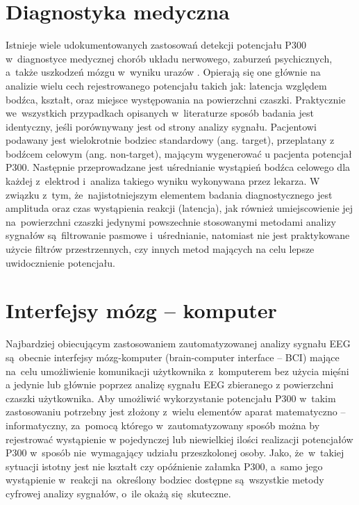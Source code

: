 \documentclass[licencjacka,openright]{pracamgr}
\begin{document}
\section{Diagnostyka medyczna}
Istnieje wiele udokumentowanych zastosowań detekcji potencjału P300 w~diagnostyce medycznej chorób układu nerwowego, zaburzeń psychicznych, a~także uszkodzeń mózgu w~wyniku urazów \citep{zgorzalewicz2000}. Opierają się one głównie na analizie wielu cech rejestrowanego potencjału takich jak: latencja względem bodźca, kształt, oraz miejsce występowania na powierzchni czaszki. Praktycznie we~wszystkich przypadkach opisanych w~literaturze sposób badania jest identyczny, jeśli porównywany jest od strony analizy sygnału. Pacjentowi podawany jest wielokrotnie bodziec standardowy (ang. target), przeplatany z bodźcem celowym (ang. non-target), mającym wygenerować u pacjenta potencjał P300. Następnie przeprowadzane jest uśrednianie wystąpień bodźca celowego dla każdej z~elektrod i~analiza takiego wyniku wykonywana przez lekarza. 
W związku z~tym, że~najistotniejszym elementem badania diagnostycznego jest amplituda oraz czas wystąpienia reakcji (latencja), jak również umiejscowienie jej na~powierzchni czaszki \citep{chudzik2004} jedynymi powszechnie stosowanymi metodami analizy sygnałów są~filtrowanie pasmowe i~uśrednianie, natomiast nie jest praktykowane użycie filtrów przestrzennych, czy innych metod mających na celu lepsze uwidocznienie potencjału.

\section{Interfejsy mózg -- komputer}
Najbardziej obiecującym zastosowaniem zautomatyzowanej analizy sygnału EEG są~obecnie interfejsy mózg-komputer (brain-computer interface -- BCI) mające na~celu umożliwienie komunikacji użytkownika z~komputerem bez użycia mięśni a jedynie lub głównie poprzez analizę sygnału EEG zbieranego z powierzchni czaszki użytkownika. Aby umożliwić wykorzystanie potencjału P300 w~takim zastosowaniu potrzebny jest złożony z~wielu elementów aparat matematyczno -- informatyczny, za~pomocą którego w~zautomatyzowany sposób można by rejestrować wystąpienie w pojedynczej lub niewielkiej ilości realizacji potencjałów P300 w~sposób nie~wymagający udziału przeszkolonej osoby. Jako, że~w~takiej sytuacji istotny jest nie kształt czy opóźnienie załamka P300, a~samo jego wystąpienie w~reakcji na~określony bodziec dostępne są~wszystkie metody cyfrowej analizy sygnałów, o~ile okażą się~skuteczne.
\end{document}
